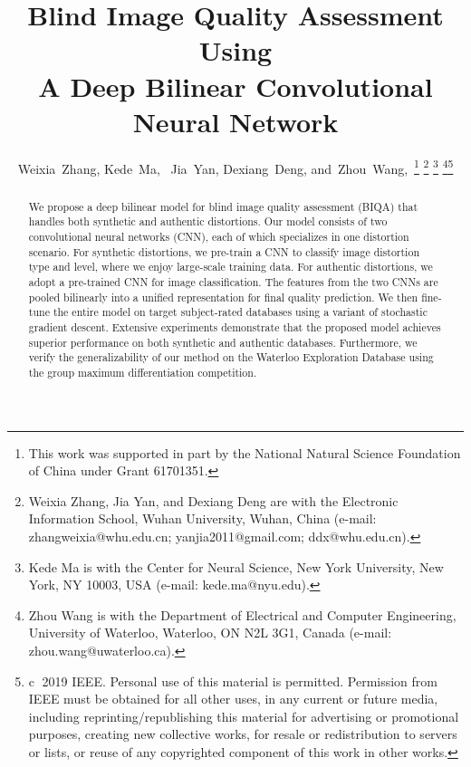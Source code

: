 \documentclass[journal]{IEEEtran}
\begin{document}
\title{Blind Image Quality Assessment Using \\ A Deep Bilinear Convolutional Neural Network}


\author{Weixia~Zhang,
        Kede~Ma,~
        Jia~Yan,
        Dexiang~Deng,
        and~Zhou~Wang,~\thanks{This work was supported in part by the National Natural Science Foundation of China under Grant 61701351.}
\thanks{Weixia Zhang, Jia Yan, and Dexiang Deng are with the Electronic Information School, Wuhan University, Wuhan, China (e-mail: zhangweixia@whu.edu.cn; yanjia2011@gmail.com; ddx@whu.edu.cn).}
\thanks{Kede Ma is with the Center for Neural Science, New York University, New York, NY 10003, USA (e-mail: kede.ma@nyu.edu).}
\thanks{Zhou Wang is with the Department of Electrical and Computer Engineering, University of Waterloo, Waterloo, ON N2L 3G1, Canada (e-mail: zhou.wang@uwaterloo.ca).}\thanks{\textcircled{c} 2019 IEEE. Personal use of this material is permitted. Permission from IEEE must be obtained for all other uses, in any current or future media, including reprinting/republishing this material for advertising or promotional purposes, creating new collective works, for resale or redistribution to servers or lists, or reuse of any copyrighted component of this work in other works.}
}

















\maketitle

\begin{abstract}
We propose a deep bilinear model for blind image quality assessment (BIQA) that handles both synthetic and authentic distortions. Our model consists of two convolutional neural networks (CNN), each of which  specializes in one distortion scenario. For synthetic distortions, we pre-train a CNN to classify image distortion type and level, where we enjoy large-scale training data. For authentic distortions, we adopt a pre-trained CNN for image classification. The features from the two CNNs are  pooled bilinearly into a unified representation for final quality prediction. We then fine-tune the entire model on target subject-rated databases using a variant of stochastic gradient descent. Extensive experiments demonstrate that the proposed model achieves superior performance on both synthetic and authentic databases. Furthermore, we verify the generalizability of our method on the Waterloo Exploration Database  using the group maximum differentiation competition.
\end{abstract}
\end{document}
